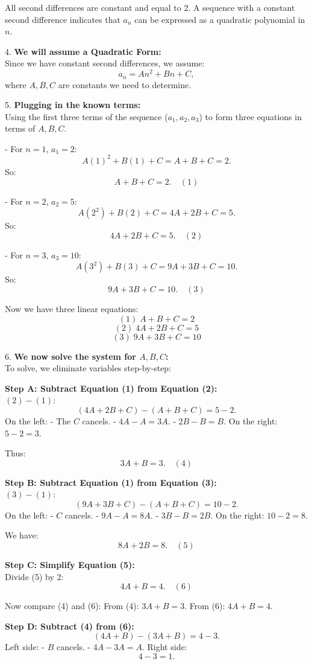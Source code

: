 \documentclass[12pt,a4paper]{article}
\begin{document}
All second differences are constant and equal to 2. A sequence with a constant second difference indicates that \( a_n \) can be expressed as a quadratic polynomial in \( n \).

4. \textbf{We will assume a Quadratic Form:} \\
Since we have constant second differences, we assume:
\[
a_n = A n^2 + B n + C,
\]
where \( A, B, C \) are constants we need to determine.
\bigskip

5. \textbf{Plugging in the known terms:} \\
Using the first three terms of the sequence (\( a_1, a_2, a_3 \)) to form three equations in terms of \( A, B, C \).

\bigskip
- For \( n=1 \), \( a_1=2 \):
\[
A(1)^2+B(1)+C = A + B + C = 2.
\]
So:
\[
A + B + C = 2. \quad (1)
\]

- For \( n=2 \), \( a_2=5 \):
\[
A(2^2)+B(2)+C = 4A + 2B + C = 5.
\]
So:
\[
4A + 2B + C = 5. \quad (2)
\]

- For \( n=3 \), \( a_3=10 \):
\[
A(3^2)+B(3)+C = 9A + 3B + C = 10.
\]
So:
\[
9A + 3B + C = 10. \quad (3)
\]

Now we have three linear equations:
\[
(1)\; A+B+C=2
\]
\[
(2)\; 4A+2B+C=5
\]
\[
(3)\; 9A+3B+C=10
\]

6. \textbf{We now solve the system for \( A, B, C \):} \\
To solve, we eliminate variables step-by-step:

\bigskip

\textbf{Step A: Subtract Equation (1) from Equation (2):} \\
\((2)-(1)\):
\[
(4A+2B+C) - (A+B+C) = 5 - 2.
\]
On the left:
- The \(C\) cancels.
- \(4A - A = 3A\).
- \(2B - B = B\).
On the right: \(5-2=3\).

Thus:
\[
3A + B = 3. \quad (4)
\]

\textbf{Step B: Subtract Equation (1) from Equation (3):} \\
\((3)-(1)\):
\[
(9A+3B+C) - (A+B+C) = 10 - 2.
\]
On the left:
- \(C\) cancels.
- \(9A - A = 8A\).
- \(3B - B = 2B\).
On the right: \(10-2=8\).

We have:
\[
8A + 2B = 8. \quad (5)
\]

\textbf{Step C: Simplify Equation (5):} \\
Divide (5) by 2:
\[
4A + B =4. \quad (6)
\]

Now compare (4) and (6):
From (4): \(3A+B=3\).
From (6): \(4A+B=4\).
\bigskip

\textbf{Step D: Subtract (4) from (6):} \\
\[
(4A+B) - (3A+B)=4 - 3.
\]
Left side:
- \(B\) cancels.
- \(4A-3A= A\).
Right side:
\[
4-3=1.
\]
\end{document}
